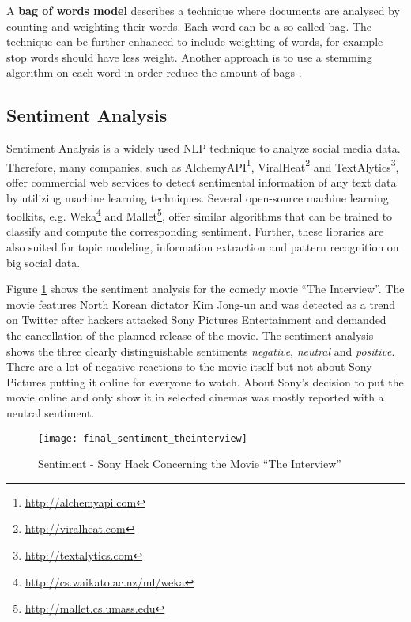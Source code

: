 A \textbf{bag of words model} describes a technique where documents are analysed by counting and weighting their words. Each word can be a so called bag. The technique can be further enhanced to include weighting of words, for example stop words should have less weight. Another approach is to use a stemming algorithm on each word in order reduce the amount of bags \cite[117]{manning2008introduction}.


\subsection{Sentiment Analysis}
\label{subsec:sentiment-analysis}
Sentiment Analysis is a widely used NLP technique to analyze social media data. Therefore, many companies, such as AlchemyAPI\footnote{\url{http://alchemyapi.com} \accessednote}, ViralHeat\footnote{\url{http://viralheat.com} \accessednote} and TextAlytics\footnote{\url{http://textalytics.com} \accessednote}, offer commercial web services to detect sentimental information of any text data by utilizing machine learning techniques. Several open-source machine learning toolkits, e.g. Weka\footnote{\url{http://cs.waikato.ac.nz/ml/weka} \accessednote} and Mallet\footnote{\url{http://mallet.cs.umass.edu} \accessednote}, offer similar algorithms that can be trained to classify and compute the corresponding sentiment. Further, these libraries are also suited for topic modeling, information extraction and pattern recognition on big social data.

Figure \ref{fig:sentiment-interview} shows the sentiment analysis for the comedy movie \enquote{The Interview}. The movie features North Korean dictator Kim Jong-un and was detected as a trend on Twitter after hackers attacked Sony Pictures Entertainment and demanded the cancellation of the planned release of the movie. The sentiment analysis shows the three clearly distinguishable sentiments \textit{negative}, \textit{neutral} and \textit{positive}. There are a lot of negative reactions to the movie itself but not about Sony Pictures putting it online for everyone to watch. About Sony's decision to put the movie online and only show it in selected cinemas was mostly reported with a neutral sentiment.

\begin{figure}[H]
  \centering
        \texttt{[image: final\_sentiment\_theinterview]}
  \caption[Sentiment - Sony Hack Concerning the Movie \enquote{The Interview}]{Sentiment - Sony Hack Concerning the Movie \enquote{The Interview}}
  \label{fig:sentiment-interview}
  \vspace{-1.3em}
\end{figure}

